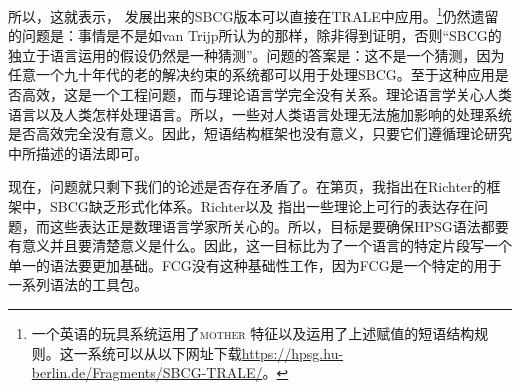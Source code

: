 所以，这就表示， \citet{Sag2012a} 发展出来的SBCG版本可以直接在TRALE中应用。\footnote{%
一个英语的玩具系统运用了\textsc{mother} 特征以及运用了上述赋值的短语结构规则。这一系统可以从以下网址下载\url{https://hpsg.hu-berlin.de/Fragments/SBCG-TRALE/}。%
}仍然遗留的问题是：事情是不是如van Trijp所认为的那样，除非得到证明，否则“SBCG的独立于语言运用的假设仍然是一种猜测”。问题的答案是：这不是一个猜测，因为任意一个九十年代的老的解决约束的系统都可以用于处理SBCG。至于这种应用是否高效，这是一个工程问题，而与理论语言学完全没有关系。理论语言学关心人类语言以及人类怎样处理语言。所以，一些对人类语言处理无法施加影响的处理系统是否高效完全没有意义。因此，短语结构框架也没有意义，只要它们遵循理论研究中所描述的语法即可。

现在，问题就只剩下我们的论述是否存在矛盾了。在第\pageref{page-sbcg-formalization}页，我指出在Richter的框架\citep{Richter2004a-u}中，SBCG缺乏形式化体系。Richter以及 \citet{LM2006a}指出一些理论上可行的表达存在问题，而这些表达正是数理语言学家所关心的。所以，目标是要确保HPSG语法都要有意义并且要清楚意义是什么。因此，这一目标比为了一个语言的特定片段写一个单一的语法要更加基础。FCG没有这种基础性工作，因为FCG是一个特定的用于一系列语法的工具包。

